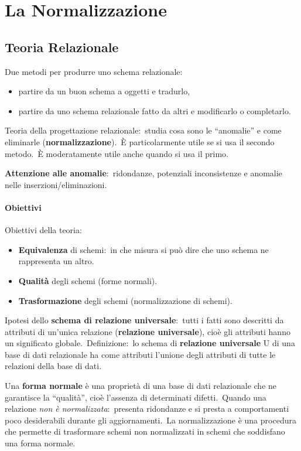 \chapter{La Normalizzazione}

\section{Teoria Relazionale}

Due metodi per produrre uno schema relazionale:

\begin{itemize}
	\item partire da un buon schema a oggetti e tradurlo,
	\item partire da uno schema relazionale fatto da altri e modificarlo o completarlo.
\end{itemize}

\noindent Teoria della progettazione relazionale:\ studia cosa sono le ``anomalie'' e come eliminarle (\textbf{normalizzazione}).\
È particolarmente utile se si usa il secondo metodo.\
È moderatamente utile anche quando si usa il primo.

\textbf{Attenzione alle anomalie}:\ ridondanze, potenziali inconsistenze e anomalie nelle inserzioni/eliminazioni.

\subsubsection{Obiettivi}

Obiettivi della teoria:

\begin{itemize}
	\item \textbf{Equivalenza} di schemi:\ in che misura si può dire che uno schema ne rappresenta un altro.
	\item \textbf{Qualità} degli schemi (forme normali).
	\item \textbf{Trasformazione} degli schemi (normalizzazione di schemi).
\end{itemize}

\noindent Ipotesi dello \textbf{schema di relazione universale}:\ tutti i fatti sono descritti da attributi di un'unica relazione (\textbf{relazione universale}), cioè gli attributi hanno un significato globale.\
Definizione:\ lo schema di \textbf{relazione universale} U di una base di dati relazionale ha come attributi l'unione degli attributi di tutte le relazioni della base di dati.

Una \textbf{forma normale} è una proprietà di una base di dati relazionale che ne garantisce la ``qualità'', cioè l'assenza di determinati difetti.\
Quando una relazione \textit{non è normalizzata}:\ presenta ridondanze e si presta a comportamenti poco desiderabili durante gli aggiornamenti.\
La normalizzazione è una procedura che permette di trasformare schemi non normalizzati in schemi che soddisfano una forma normale.

